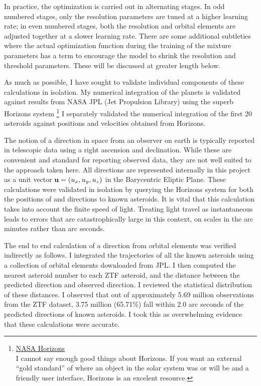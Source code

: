 In practice, the optimization is carried out in alternating stages.
In odd numbered stages, only the resolution parameters are tuned at a higher learning rate;
in even numbered stages, both the resolution and orbital elements are adjusted together at a slower learning rate.
There are some additional subtleties where the actual optimization function during the training of the mixture
parameters has a term to encourage the model to shrink the resolution and threshold parameters.
These will be discussed at greater length below.

As much as possible, I have sought to validate individual components of these calculations in isolation.
My numerical integration of the planets is validated against results from NASA JPL (Jet Propulsion Library)
using the superb Horizons system
\footnote{
\href{https://ssd.jpl.nasa.gov/horizons.cgi}{NASA Horizons} \\
I cannot say enough good things about Horizons.
If you want an external ``gold standard'' of where an object in the solar system was or will be 
and a friendly user interface, Horizons is an excelent resource.}
I separately validated the numerical integration of the first 20 asteroids against positions and velocities obtained from Horizons. \\

The notion of a direction in space from an observer on earth is typically reported in telescopic data using a right ascension and declination.
While these are convenient and standard for reporting observed data, they are not well suited to the approach taken here.
All directions are represented internally in this project as a unit vector $\mathbf{u} = (u_x, u_y, u_z)$ in the Barycentric Eliptic Plane.
These calculations were validated in isolation by querying the Horizons system for both the positions of and directions to known asteroids.
It is vital that this calculation takes into account the finite speed of light.
Treating light travel as instantaneous leads to errors that are catastrophically large in this context, on scales in the arc minutes rather than arc seconds.

The end to end calculation of a direction from orbital elements was verified indirectly as follows.
I integrated the trajectories of all the known asteroids using a collection of orbital elements downloaded from JPL.
I then computed the nearest asteroid number to each ZTF asteroid, and the distance between the predicted direction and observed direction.
I reviewed the statistical distribution of these distances.
I observed that out of approximately 5.69 million observations from the ZTF dataset,
3.75 million (65.71\%) fall within 2.0 arc seconds of the predicted directions of known asteroids.
I took this as overwhelming evidence that these calculations were accurate.

